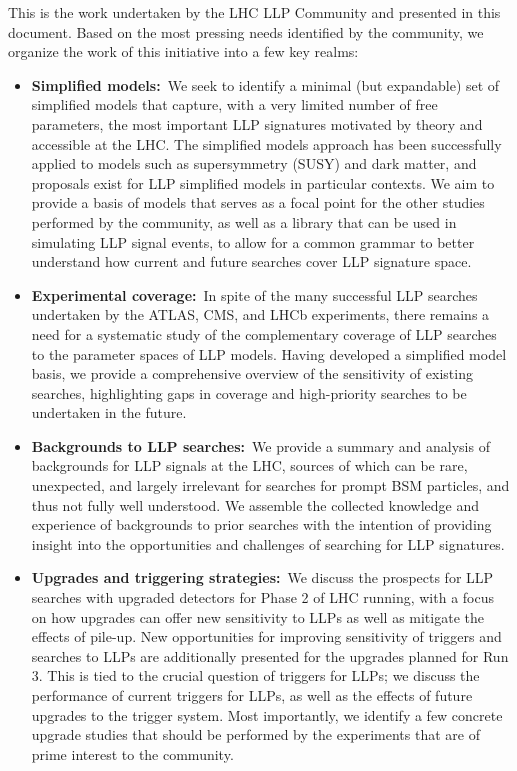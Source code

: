 This is the work undertaken by the LHC LLP Community and presented in this document.
Based on the most pressing needs identified by the community, we organize the work of this initiative into a few key realms:
%
\begin{itemize}

\item {\bf Simplified models:}~We seek to identify a minimal (but expandable) set of simplified models that capture, with a very limited number of free parameters, the most important LLP signatures motivated by theory and accessible at the LHC.
The simplified models approach has been successfully applied to models such as supersymmetry (SUSY) and dark matter, and proposals exist for LLP simplified models in particular contexts.
We aim to provide a basis of models that serves as a focal point for the other studies performed by the community, as well as a library that can be used in simulating LLP signal events, to allow for a common grammar to better understand how current and future searches cover LLP signature space.

\item {\bf Experimental coverage:}~In spite of the many successful LLP searches undertaken by the ATLAS, CMS, and LHCb experiments, there remains a need for a systematic study of the complementary coverage of LLP searches to the parameter spaces of LLP models.
Having developed a simplified model basis, we provide a comprehensive overview of the sensitivity of existing searches, highlighting gaps in coverage and high-priority searches to be undertaken in the future.

\item {\bf Backgrounds to LLP searches:}~We provide a summary and analysis of backgrounds for LLP signals at the LHC, sources of which can be rare, unexpected, and largely irrelevant for searches for prompt BSM particles, and thus not fully well understood.
We assemble the collected knowledge and experience of backgrounds to prior searches with the intention of providing insight into the opportunities and challenges of searching for LLP signatures.

\item {\bf Upgrades and triggering strategies:}~We discuss the prospects for LLP searches with upgraded detectors for Phase 2 of LHC running, with a focus on how upgrades can offer new sensitivity to LLPs as well as mitigate the effects of pile-up. New opportunities for improving sensitivity of triggers and searches to LLPs are additionally presented for the upgrades planned for Run 3.
This is tied to the crucial question of triggers for LLPs; we discuss the performance of current triggers for LLPs, as well as the effects of future upgrades to the trigger system.
Most importantly, we identify a few concrete upgrade studies that should be performed by the experiments that are of prime interest to the community.


\end{itemize}
